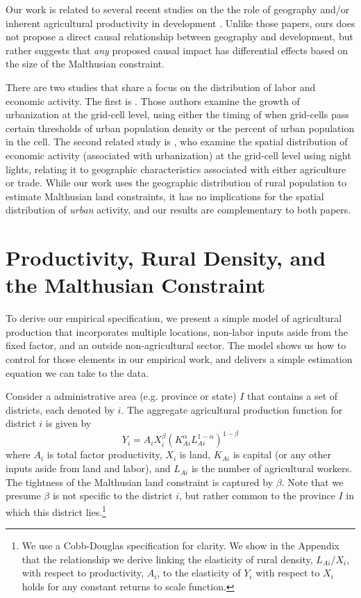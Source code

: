\documentclass[11pt]{article}
\begin{document}
Our work is related to several recent studies on the the role of geography and/or inherent agricultural productivity in development \citep{oh2005,ashraf2010dynamics,Nunn2011,Nunn2012,mich2012,agn2013,cook14,cook2014role,fenske2014,alsan2015,ashrafmich2015,dks2015,galorozak2016,litina2016,ads2016,FrankemaPap2017}. Unlike those papers, ours does not propose a direct causal relationship between geography and development, but rather suggests that \textit{any} proposed causal impact has differential effects based on the size of the Malthusian constraint. 

There are two studies that share a focus on the distribution of labor and economic activity. The first is \citet{mfm2014}. Those authors examine the growth of urbanization at the grid-cell level, using either the timing of when grid-cells pass certain thresholds of urban population density or the percent of urban population in the cell. The second related study is \citet{hssw2016}, who examine the spatial distribution of economic activity (associated with urbanization) at the grid-cell level using night lights, relating it to geographic characteristics associated with either agriculture or trade. While our work uses the geographic distribution of rural population to estimate Malthusian land constraints, it has no implications for the spatial distribution of \textit{urban} activity, and our results are complementary to both papers.

\section{Productivity, Rural Density, and the Malthusian Constraint}\label{SEC_agmodel}
To derive our empirical specification, we present a simple model of agricultural production that incorporates multiple locations, non-labor inputs aside from the fixed factor, and an outside non-agricultural sector. The model shows us how to control for those elements in our empirical work, and delivers a simple estimation equation we can take to the data. 

Consider a administrative area (e.g. province or state) $I$ that contains a set of districts, each denoted by $i$. The aggregate agricultural production function for district $i$ is given by 
\begin{equation}
Y_{i} = A_{i} X_{i}^{\beta} \left(K_{Ai}^{\alpha}L_{Ai}^{1-\alpha}\right)^{1-\beta} \label{EQ_production}
\end{equation}
where $A_{i}$ is total factor productivity, $X_{i}$ is land, $K_{Ai}$ is capital (or any other inputs aside from land and labor), and $L_{Ai}$ is the number of agricultural workers. The tightness of the Malthusian land constraint is captured by $\beta$. Note that we presume $\beta$ is not specific to the district $i$, but rather common to the province $I$ in which this district lies.\footnote{We use a Cobb-Douglas specification for clarity. We show in the Appendix that the relationship we derive linking the elasticity of rural density, $L_{Ai}/X_i$, with respect to productivity, $A_i$, to the elasticity of $Y_i$ with respect to $X_i$ holds for any constant returns to scale function.}
\end{document}
